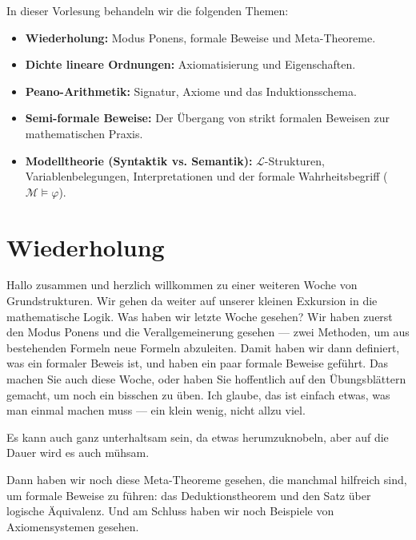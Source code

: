 


\begin{nice-box}
In dieser Vorlesung behandeln wir die folgenden Themen:
\begin{itemize}
    \item \textbf{Wiederholung:} Modus Ponens, formale Beweise und Meta-Theoreme.
    \item \textbf{Dichte lineare Ordnungen:} Axiomatisierung und Eigenschaften.
    \item \textbf{Peano-Arithmetik:} Signatur, Axiome und das Induktionsschema.
    \item \textbf{Semi-formale Beweise:} Der Übergang von strikt formalen Beweisen zur mathematischen Praxis.
    \item \textbf{Modelltheorie (Syntaktik vs. Semantik):} $\mathcal{L}$-Strukturen, Variablenbelegungen, Interpretationen und der formale Wahrheitsbegriff ($\mathcal{M} \models \varphi$).
\end{itemize}
\end{nice-box}

\section{Wiederholung}

\begin{spoken-clean}[00:00:00 - 00:01:42]
Hallo zusammen und herzlich willkommen zu einer weiteren Woche von Grundstrukturen. Wir gehen da weiter auf unserer kleinen Exkursion in die mathematische Logik. Was haben wir letzte Woche gesehen? Wir haben zuerst den Modus Ponens und die Verallgemeinerung gesehen --- zwei Methoden, um aus bestehenden Formeln neue Formeln abzuleiten. Damit haben wir dann definiert, was ein formaler Beweis ist, und haben ein paar formale Beweise geführt. Das machen Sie auch diese Woche, oder haben Sie hoffentlich auf den Übungsblättern gemacht, um noch ein bisschen zu üben. Ich glaube, das ist einfach etwas, was man einmal machen muss --- ein klein wenig, nicht allzu viel. 

Es kann auch ganz unterhaltsam sein, da etwas herumzuknobeln, aber auf die Dauer wird es auch mühsam.

Dann haben wir noch diese Meta-Theoreme gesehen, die manchmal hilfreich sind, um formale Beweise zu führen: das Deduktionstheorem und den Satz über logische Äquivalenz. Und am Schluss haben wir noch Beispiele von Axiomensystemen gesehen.
\end{spoken-clean}

